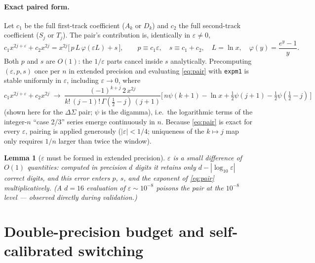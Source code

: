 \documentclass{article}
\newtheorem{lemma}{Lemma}
\begin{document}
\paragraph{Exact paired form.} Let $c_1$ be the full first-track coefficient
($A_k$ or $D_k$) and $c_2$ the full second-track coefficient ($S_j$ or
$T_j$). The pair's contribution is, identically in $\varepsilon\neq0$,
\begin{equation}\label{eq:pair}
c_1 x^{2j+\varepsilon} + c_2 x^{2j}
= x^{2j}\Big[\,p\,L\,\varphi(\varepsilon L) + s\,\Big],
\qquad
p \equiv c_1\varepsilon,\quad s\equiv c_1+c_2,\quad
L=\ln x,\quad \varphi(y)=\frac{e^{y}-1}{y}.
\end{equation}
Both $p$ and $s$ are $O(1)$: the $1/\varepsilon$ parts cancel inside $s$
analytically. Precomputing $(\varepsilon, p, s)$ once per $n$ in extended
precision and evaluating \eqref{eq:pair} with \texttt{expm1} is stable
uniformly in $\varepsilon$, including $\varepsilon\to0$, where
\begin{equation}\label{eq:pair-limit}
c_1 x^{2j+\varepsilon}+c_2 x^{2j} \;\longrightarrow\;
\frac{(-1)^{k+j}\,2\,x^{2j}}{k!\,(j\!-\!1)!\,\Gamma(\tfrac12-j)\,(j\!+\!1)}
\Big[\,n\psi(k+1) - \ln x + \tfrac12\psi(j+1)
- \tfrac12\psi(\tfrac12-j)\,\Big]
\end{equation}
(shown here for the $\Delta\Sigma$ pair; $\psi$ is the digamma), i.e.\ the
logarithmic terms of the integer-$n$ ``case 2/3'' series emerge continuously
in $n$. Because \eqref{eq:pair} is exact for every $\varepsilon$, pairing is
applied generously ($|\varepsilon|<1/4$; uniqueness of the $k\mapsto j$ map
only requires $1/n$ larger than twice the window).

\begin{lemma}[$\varepsilon$ must be formed in extended precision]
$\varepsilon$ is a small difference of $O(1)$ quantities: computed in
precision $d$ digits it retains only $d - |\log_{10}\varepsilon|$ correct
digits, and this error enters $p$, $s$, and the exponent of
\eqref{eq:pair} multiplicatively. (A $d=16$ evaluation of $\varepsilon\sim
10^{-8}$ poisons the pair at the $10^{-8}$ level --- observed directly
during validation.)
\end{lemma}

\section{Double-precision budget and self-calibrated switching}
\label{sec:budget}
\end{document}

